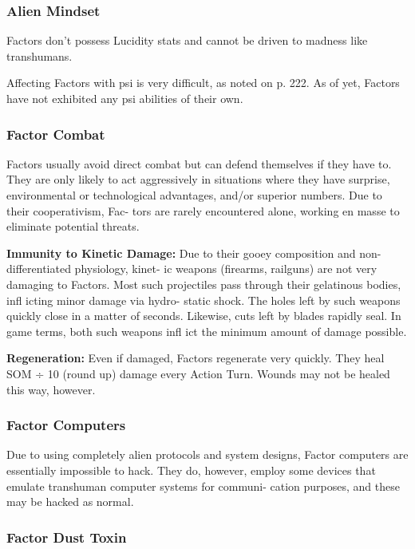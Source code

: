 \subsubsection{Alien Mindset}

Factors don't possess Lucidity stats and cannot be 
driven to madness like transhumans.

Affecting Factors with psi is very difficult, as noted 
on p. 222. As of yet, Factors have not exhibited any 
psi abilities of their own.

\subsubsection{Factor Combat }

Factors usually avoid direct combat but can defend 
themselves if they have to. They are only likely to act 
aggressively in situations where they have surprise, 
environmental or technological advantages, and/or 
superior numbers. Due to their cooperativism, Fac-
tors are rarely encountered alone, working en masse 
to eliminate potential threats.

\textbf{Immunity to Kinetic Damage: }Due to their gooey 
composition and non-differentiated physiology, kinet-
ic weapons (firearms, railguns) are not very damaging 
to Factors. Most such projectiles pass through their 
gelatinous bodies, infl icting minor damage via hydro-
static shock. The holes left by such weapons quickly 
close in a matter of seconds. Likewise, cuts left by 
blades rapidly seal. In game terms, both such weapons 
infl ict the minimum amount of damage possible. 

\textbf{Regeneration: }Even if damaged, Factors regenerate 
very quickly. They heal SOM ÷ 10 (round up) damage 
every Action Turn. Wounds may not be healed this 
way, however. 

\subsubsection{Factor Computers}

Due to using completely alien protocols and system 
designs, Factor computers are essentially impossible 
to hack. They do, however, employ some devices that 
emulate transhuman computer systems for communi-
cation purposes, and these may be hacked as normal.

\subsubsection{Factor Dust Toxin}

